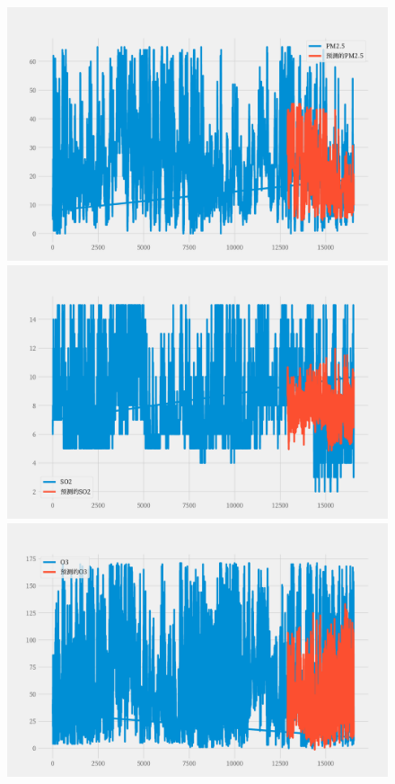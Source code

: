 \documentclass[a4paper,10pt]{my_paper}
\numberwithin{equation}{section}
\begin{document}
\begin{figure}[htbp]
\begin{minipage}[c]{0.3\textwidth}
		\end{minipage}
		\begin{minipage}[c]{0.3\textwidth}
			\centering
			\includegraphics[width=1\textwidth]{prob3/预测C地_PM2..pdf} 
		\end{minipage}
    \begin{minipage}[c]{0.3\textwidth}
			\centering
			\includegraphics[width=1\textwidth]{prob3/预测C地_SO2.pdf} 
		\end{minipage}
    \begin{minipage}[c]{0.3\textwidth}
			\centering
			\includegraphics[width=1\textwidth]{prob3/预测C地_O3.pdf} 

\end{minipage}
\end{figure}
\end{document}
